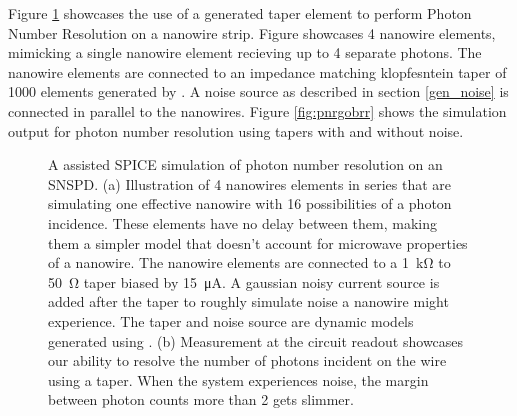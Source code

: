 Figure \ref{fig:taper_pnr} showcases the use of a  generated
taper element to perform Photon Number Resolution on a nanowire strip. 
Figure \label{fig:taper_circ} showcases 4 nanowire elements, mimicking
a single nanowire element recieving up to 4 separate photons. The nanowire
elements are connected to an impedance matching klopfesntein taper of 1000
elements generated by . A noise source as described in section
\ref{gen_noise} is connected in parallel to the nanowires. Figure \ref{fig:pnrgobrr}
shows the simulation output for photon number resolution using tapers with 
and without noise.

\begin{figure}
    \centering
    \caption{A  assisted SPICE simulation of photon number resolution on an SNSPD.
    (a) Illustration of 4 nanowires elements in series that are simulating one 
    effective nanowire with 16
    possibilities of a photon incidence. These elements have no delay between them, making
    them a simpler model that doesn't account for microwave properties of a nanowire.
    The nanowire elements are connected to a \qty{1}{\kilo\ohm} to \qty{50}{\ohm} taper
    biased by \qty{15}{\micro\ampere}. A gaussian noisy current source is added after the taper to
    roughly simulate noise a nanowire might experience.
    The taper and noise source are dynamic models generated using .
    (b) Measurement at the circuit readout showcases our ability to resolve the number of
    photons incident on the wire using a taper. When the system experiences noise, the
    margin between photon counts more than 2 gets slimmer.}
    \label{fig:taper_pnr}
\end{figure}

